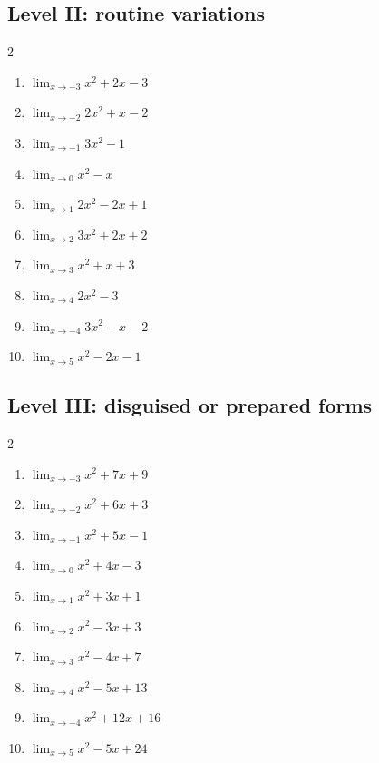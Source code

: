 \documentclass[11pt,oneside]{book}
\begin{document}
\subsection*{Level II: routine variations}
\begin{multicols}{2}
\begin{enumerate}[leftmargin=*,label=\textbf{\arabic*.},itemsep=0.65\baselineskip]
\item $\displaystyle \lim_{x \to -3} x^{2} + 2 x - 3$
\item $\displaystyle \lim_{x \to -2} 2 x^{2} + x - 2$
\item $\displaystyle \lim_{x \to -1} 3 x^{2} - 1$
\item $\displaystyle \lim_{x \to 0} x^{2} - x$
\item $\displaystyle \lim_{x \to 1} 2 x^{2} - 2 x + 1$
\item $\displaystyle \lim_{x \to 2} 3 x^{2} + 2 x + 2$
\item $\displaystyle \lim_{x \to 3} x^{2} + x + 3$
\item $\displaystyle \lim_{x \to 4} 2 x^{2} - 3$
\item $\displaystyle \lim_{x \to -4} 3 x^{2} - x - 2$
\item $\displaystyle \lim_{x \to 5} x^{2} - 2 x - 1$
\end{enumerate}
\end{multicols}
\subsection*{Level III: disguised or prepared forms}
\begin{multicols}{2}
\begin{enumerate}[leftmargin=*,label=\textbf{\arabic*.},itemsep=0.65\baselineskip]
\item $\displaystyle \lim_{x \to -3} x^{2} + 7 x + 9$
\item $\displaystyle \lim_{x \to -2} x^{2} + 6 x + 3$
\item $\displaystyle \lim_{x \to -1} x^{2} + 5 x - 1$
\item $\displaystyle \lim_{x \to 0} x^{2} + 4 x - 3$
\item $\displaystyle \lim_{x \to 1} x^{2} + 3 x + 1$
\item $\displaystyle \lim_{x \to 2} x^{2} - 3 x + 3$
\item $\displaystyle \lim_{x \to 3} x^{2} - 4 x + 7$
\item $\displaystyle \lim_{x \to 4} x^{2} - 5 x + 13$
\item $\displaystyle \lim_{x \to -4} x^{2} + 12 x + 16$
\item $\displaystyle \lim_{x \to 5} x^{2} - 5 x + 24$
\end{enumerate}
\end{multicols}
\end{document}
